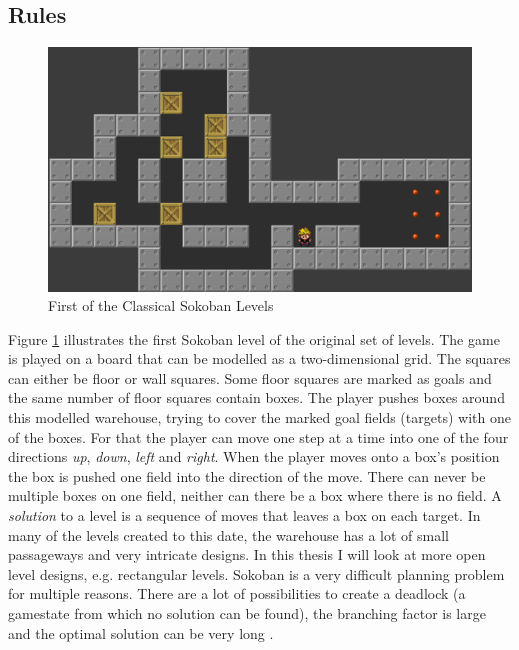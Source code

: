 \documentclass{article}
\begin{document}
\subsection{Rules}
\begin{figure}[h]
\centering
\includegraphics[scale=0.2]{SokobanLevel1}
\caption{First of the Classical Sokoban Levels}
\label{fig:1}
\end{figure}
Figure \ref{fig:1} illustrates the first Sokoban level of the original set of levels. The game is played on a board that can be modelled as a two-dimensional grid. The squares can either be floor or wall squares. Some floor squares are marked as goals and the same number of floor squares contain boxes. The player pushes boxes around this modelled warehouse, trying to cover the marked goal fields (targets) with one of the boxes. For that the player can move one step at a time into one of the four directions \textit{up}, \textit{down}, \textit{left} and \textit{right}. When the player moves onto a box's position the box is pushed one field into the direction of the move. There can never be multiple boxes on one field, neither can there be a box where there is no field. A \textit{solution} to a level is a sequence of moves that leaves a box on each target.
In many of the levels created to this date, the warehouse has a lot of small passageways and very intricate designs. In this thesis I will look at more open level designs, e.g. rectangular levels.
Sokoban is a very difficult planning problem for multiple reasons. There are a lot of possibilities to create a deadlock (a gamestate from which no solution can be found), the branching factor is large and the optimal solution can be very long \cite{BoteaHeuristicsVsPlanning}.

\newpage
\end{document}
